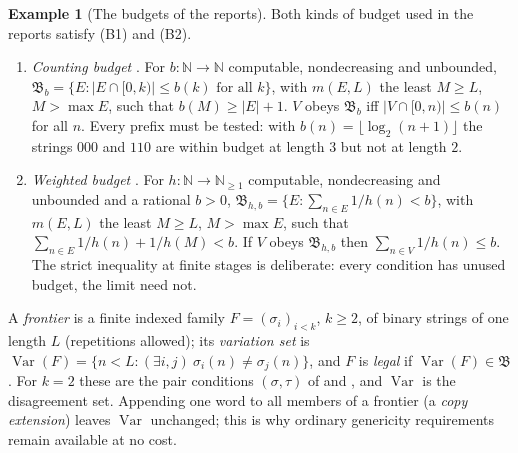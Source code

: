 \documentclass[11pt,letterpaper]{article}
\theoremstyle{definition}
\newtheorem{example}[definition]{Example}
\numberwithin{equation}{section}
\newcommand{\N}{\mathbb N}
\newcommand{\Var}{\operatorname{Var}}
\newcommand{\bud}{\mathfrak B}
\newcommand{\src}[1]{\leavevmode{\sffamily\footnotesize\color{Steel}[#1]}}
\newcommand{\rep}[1]{\leavevmode{\sffamily\small\color{Steel}R#1}}
\begin{document}
\begin{example}[The budgets of the reports]\label{ex:budgets}
Both kinds of budget used in the reports satisfy (B1) and (B2).
\begin{enumerate}[label=\textup{(\alph*)}]
\item \emph{Counting budget} \src{R2, R6}. For $b:\N\to\N$ computable, nondecreasing and unbounded, $\bud_b=\{E:|E\cap[0,k)|\le b(k)\text{ for all }k\}$, with $m(E,L)$ the least $M\ge L$, $M>\max E$, such that $b(M)\ge|E|+1$. $V$ obeys $\bud_b$ iff $|V\cap[0,n)|\le b(n)$ for all $n$. Every prefix must be tested: with $b(n)=\lfloor\log_2(n+1)\rfloor$ the strings $000$ and $110$ are within budget at length $3$ but not at length $2$.
\item \emph{Weighted budget} \src{R7}. For $h:\N\to\N_{\ge1}$ computable, nondecreasing and unbounded and a rational $b>0$, $\bud_{h,b}=\{E:\sum_{n\in E}1/h(n)<b\}$, with $m(E,L)$ the least $M\ge L$, $M>\max E$, such that $\sum_{n\in E}1/h(n)+1/h(M)<b$. If $V$ obeys $\bud_{h,b}$ then $\sum_{n\in V}1/h(n)\le b$. The strict inequality at finite stages is deliberate: every condition has unused budget, the limit need not.
\end{enumerate}
\end{example}

A \emph{frontier} is a finite indexed family $F=(\sigma_i)_{i<k}$, $k\ge2$, of binary strings of one length $L$ (repetitions allowed); its \emph{variation set} is $\Var(F)=\{n<L:(\exists i,j)\ \sigma_i(n)\ne\sigma_j(n)\}$, and $F$ is \emph{legal} if $\Var(F)\in\bud$. For $k=2$ these are the pair conditions $(\sigma,\tau)$ of \rep2 and \rep7, and $\Var$ is the disagreement set. Appending one word to all members of a frontier (a \emph{copy extension}) leaves $\Var$ unchanged; this is why ordinary genericity requirements remain available at no cost.
\end{document}
